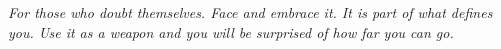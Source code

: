 \documentclass[pretext-section.tex]{subfiles}
\begin{document}
\begin{dedicatoria}
    \vspace*{\fill}
    \centering
    \noindent
    \textit{For those who doubt themselves. Face and embrace it. It is 
    part of what defines you. Use it as a weapon and you will be surprised 
    of how far you can go.} 
    \vspace*{\fill}
 \end{dedicatoria}
\end{document}
